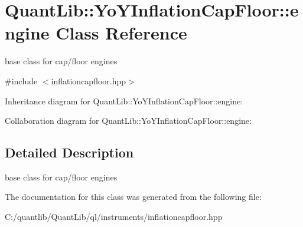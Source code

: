 \section{Quant\+Lib\+:\+:Yo\+Y\+Inflation\+Cap\+Floor\+:\+:engine Class Reference}
\label{class_quant_lib_1_1_yo_y_inflation_cap_floor_1_1engine}


base class for cap/floor engines  




{\ttfamily \#include $<$inflationcapfloor.\+hpp$>$}



Inheritance diagram for Quant\+Lib\+:\+:Yo\+Y\+Inflation\+Cap\+Floor\+:\+:engine\+:


Collaboration diagram for Quant\+Lib\+:\+:Yo\+Y\+Inflation\+Cap\+Floor\+:\+:engine\+:


\subsection{Detailed Description}
base class for cap/floor engines 

The documentation for this class was generated from the following file\+:\begin{DoxyCompactItemize}
\item 
C\+:/quantlib/\+Quant\+Lib/ql/instruments/inflationcapfloor.\+hpp\end{DoxyCompactItemize}
